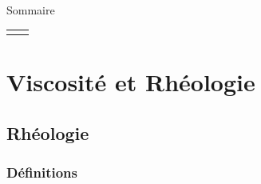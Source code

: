 \begin{frame}{Sommaire}

\small
  
\hspace*{2mm}
\begin{tabular}{cc}
  		\begin{minipage}{62mm}
  			\tableofcontents[firstsection=0]
      \vspace{15mm}
  		\end{minipage}
  		&   
  		\begin{minipage}{60cm}
		  \vspace*{-5mm}  
  		\end{minipage}
  	\end{tabular}

\vspace{0mm}

\end{frame}




\section{Viscosité et Rhéologie}

\subsection{Rhéologie}

\subsubsection{Définitions}


